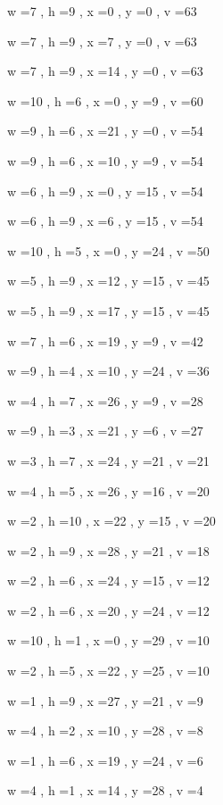 \documentclass[11pt]{article}
\begin{document}
w =7 , h =9 , x =0 , y =0 , v =63
\par
w =7 , h =9 , x =7 , y =0 , v =63
\par
w =7 , h =9 , x =14 , y =0 , v =63
\par
w =10 , h =6 , x =0 , y =9 , v =60
\par
w =9 , h =6 , x =21 , y =0 , v =54
\par
w =9 , h =6 , x =10 , y =9 , v =54
\par
w =6 , h =9 , x =0 , y =15 , v =54
\par
w =6 , h =9 , x =6 , y =15 , v =54
\par
w =10 , h =5 , x =0 , y =24 , v =50
\par
w =5 , h =9 , x =12 , y =15 , v =45
\par
w =5 , h =9 , x =17 , y =15 , v =45
\par
w =7 , h =6 , x =19 , y =9 , v =42
\par
w =9 , h =4 , x =10 , y =24 , v =36
\par
w =4 , h =7 , x =26 , y =9 , v =28
\par
w =9 , h =3 , x =21 , y =6 , v =27
\par
w =3 , h =7 , x =24 , y =21 , v =21
\par
w =4 , h =5 , x =26 , y =16 , v =20
\par
w =2 , h =10 , x =22 , y =15 , v =20
\par
w =2 , h =9 , x =28 , y =21 , v =18
\par
w =2 , h =6 , x =24 , y =15 , v =12
\par
w =2 , h =6 , x =20 , y =24 , v =12
\par
w =10 , h =1 , x =0 , y =29 , v =10
\par
w =2 , h =5 , x =22 , y =25 , v =10
\par
w =1 , h =9 , x =27 , y =21 , v =9
\par
w =4 , h =2 , x =10 , y =28 , v =8
\par
w =1 , h =6 , x =19 , y =24 , v =6
\par
w =4 , h =1 , x =14 , y =28 , v =4
\par
\newpage
\end{document}
